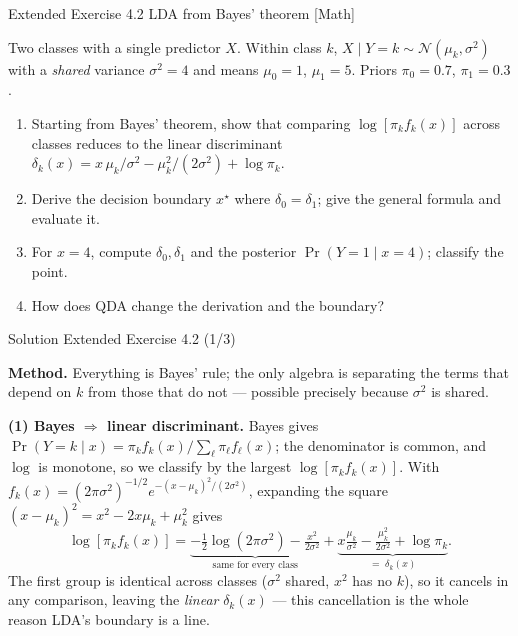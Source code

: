 \documentclass[aspectratio=169,11pt]{beamer}
\begin{document}
\begin{frame}{Extended Exercise 4.2 \textemdash{} LDA from Bayes' theorem [Math]}
\begin{longexercise}
Two classes with a single predictor $X$. Within class $k$,
$X\mid Y=k\sim\mathcal{N}(\mu_k,\sigma^2)$ with a \emph{shared} variance
$\sigma^2=4$ and means $\mu_0=1$, $\mu_1=5$. Priors $\pi_0=0.7$,
$\pi_1=0.3$.
\begin{enumerate}
  \item Starting from Bayes' theorem, show that comparing
        $\log[\pi_k f_k(x)]$ across classes reduces to the linear
        discriminant
        $\delta_k(x)=x\,\mu_k/\sigma^2-\mu_k^2/(2\sigma^2)+\log\pi_k$.
  \item Derive the decision boundary $x^\star$ where
        $\delta_0=\delta_1$; give the general formula and evaluate it.
  \item For $x=4$, compute $\delta_0,\delta_1$ and the posterior
        $\Pr(Y=1\mid x=4)$; classify the point.
  \item How does QDA change the derivation and the boundary?
\end{enumerate}
\end{longexercise}
\end{frame}

\begin{frame}{Solution \textemdash{} Extended Exercise 4.2 (1/3)}
\begin{solutionbox}
\textbf{Method.} Everything is Bayes' rule; the only algebra is
separating the terms that depend on $k$ from those that do not ---
possible precisely because $\sigma^2$ is shared.

\vspace{1mm}
\textbf{(1) Bayes $\Rightarrow$ linear discriminant.}
Bayes gives $\Pr(Y=k\mid x)=\pi_k f_k(x)/\sum_\ell \pi_\ell f_\ell(x)$;
the denominator is common, and $\log$ is monotone, so we classify by
the largest $\log[\pi_k f_k(x)]$. With
$f_k(x)=(2\pi\sigma^2)^{-1/2}e^{-(x-\mu_k)^2/(2\sigma^2)}$, expanding
the square $(x-\mu_k)^2 = x^2 - 2x\mu_k + \mu_k^2$ gives
\[
  \log[\pi_k f_k(x)]=
  \underbrace{-\tfrac12\log(2\pi\sigma^2)-\tfrac{x^2}{2\sigma^2}}_{\text{same for every class}}
  +\underbrace{x\tfrac{\mu_k}{\sigma^2}-\tfrac{\mu_k^2}{2\sigma^2}+\log\pi_k}_{=\;\delta_k(x)} .
\]
The first group is identical across classes ($\sigma^2$ shared, $x^2$ has
no $k$), so it cancels in any comparison, leaving the \emph{linear}
$\delta_k(x)$ --- this cancellation is the whole reason LDA's boundary
is a line.
\end{solutionbox}
\end{frame}
\end{document}
